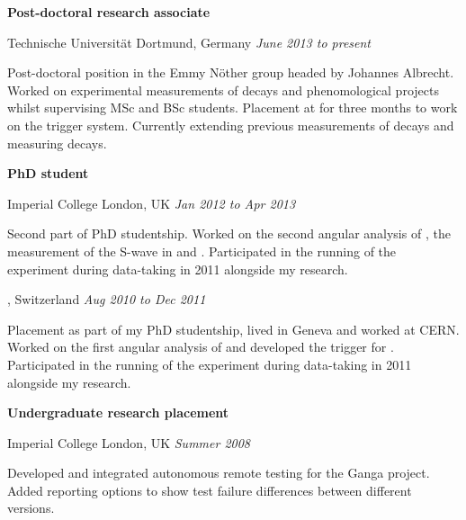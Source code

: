 \documentclass[10pt]{article}
\renewenvironment{compactitem}{
  \begin{list}{}{
    \setlength{\leftmargin}{1em}
    \setlength{\pltopsep}{\smallskipamount}
    \setlength{\plitemsep}{0.1pt}
\setlength{\plparsep}{0.1pt}
  }
}{
  \end{list}
}
\def\tud{Technische Universit\"at Dortmund}
\def\icl{Imperial College London}
\begin{document}
\textbf{Post-doctoral research associate}
\begin{compactitem}
\item {\tud, Germany}  \hfill \textit{June 2013 to present}
\begin{compactitem}
\item Post-doctoral position in the Emmy N\"other group headed by Johannes Albrecht. %
Worked on experimental measurements of \btosll decays and phenomological projects whilst supervising MSc and BSc students.
Placement at \cern for three months to work on the \lhcb trigger system.
Currently extending previous measurements of \btosll decays and measuring \btodll decays.
\end{compactitem}
\end{compactitem}

\textbf{PhD student}
\begin{compactitem}
\item \icl, UK    \hfill \textit{Jan 2012 to Apr 2013}
\begin{compactitem}
\item Second part of PhD studentship.
Worked on the second angular analysis of \BdKstmm, the measurement of the \kpi S-wave in \BdKstmm and .
Participated in the running of the \lhcb experiment during data-taking in 2011 alongside my research. 
\end{compactitem}
\cern, Switzerland   \hfill \textit{Aug 2010 to Dec 2011}
\begin{compactitem}
\item Placement as part of my PhD studentship, lived in Geneva and worked at CERN.
Worked on the first angular analysis of \BdKstmm and developed the trigger for \lhcb.
Participated in the running of the \lhcb experiment during data-taking in 2011 alongside my research. 
\end{compactitem}
\end{compactitem}

\textbf{Undergraduate research placement} 
\begin{compactitem}
\item \icl, UK    \hfill \textit{Summer 2008}
\begin{compactitem}
\item Developed and integrated autonomous remote testing for the Ganga project.  
Added reporting options to show test failure differences between different versions.
\end{compactitem}
\end{compactitem}
\end{document}
